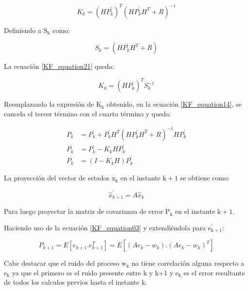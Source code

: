 \documentclass[10pt,a4paper]{article}
\begin{document}
\begin{equation}
    K_k = (H P^\prime_k)^T (H P^\prime_k H^T + R)^{-1} 
    \label{KF_equation21}
\end{equation}	

\noindent Definiendo a $\mathrm{S_k}$ como:

\begin{equation}
    S_k = (H P^\prime_k H^T + R)
    \label{KF_equation22}
\end{equation}	

\noindent La ecuación \ref{KF_equation21} queda:

\begin{equation}
    K_k = (H P^\prime_k)^T S_k^{-1} 
    \label{K_Gain}
\end{equation}	

\noindent Reemplazando la expresión de $\mathrm{K_k}$ obtenido, en la 
ecuación  \ref{KF_equation14}, se cancela el tercer término con el cuarto 
término y queda:

\begin{align}
    P_k  &= P^\prime_k + P^\prime_k H^T (H P^\prime_k H^T + R)^{-1} H P^\prime_k \nonumber \\
    P_k  &= P^\prime_k - K_k H P^\prime_k \nonumber\\
    P_k  &= (I - K_k H) P^\prime_k	
    \label{KF_equation23}	
\end{align}

\noindent La proyección del vector de estados $\mathrm{x_k}$ en el instante 
$\mathrm{k+1}$ se obtiene como:

\begin{equation}
    \hat{x}^\prime_{k+1} = A \hat{x}_k 
    \label{x_k_projection}
\end{equation}	

\noindent Para luego proyectar la matriz de covarianza de error
$\mathrm{P_k}$ en el instante $\mathrm{k+1}$.

\noindent Haciendo uso de la ecuación \ref{KF_equation03} y extendiéndola 
para $\mathrm{e^\prime_{k+1}}$:

\begin{equation}
    P_{k+1} = E[e_{k+1}.e_{k+1}^{T}] = E[(A e_k-w_k).(A  e_k-w_k)^{T}]
    \label{projection_p_k_aux}
\end{equation}	

\noindent Cabe destacar que el ruido del proceso $\mathrm{w_k}$ no tiene 
correlación alguna respecto a $\mathrm{e_k}$ ya que el primero es el ruido 
presente entre k y k+1 y $\mathrm{e_k}$ es el error resultante de todos los 
calculos previos hasta el instante k.
\end{document}
